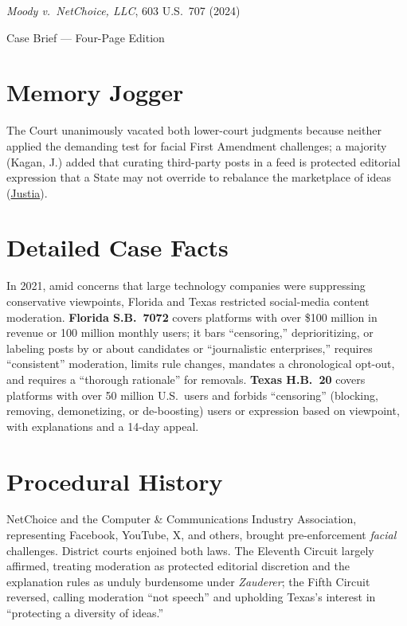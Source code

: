 \documentclass[12pt]{article}
\begin{document}
\begin{center}
{\LARGE \textit{Moody v.\ NetChoice, LLC}, 603 U.S.\ 707 (2024)\par}
\vspace{0.8em}
{\large Case Brief --- Four-Page Edition\par}
\end{center}
\vspace{1em}

\section{Memory Jogger}

The Court unanimously vacated both lower-court judgments because neither applied the demanding test for facial First Amendment challenges; a majority (Kagan, J.) added that curating third-party posts in a feed is protected editorial expression that a State may not override to rebalance the marketplace of ideas (\href{https://supreme.justia.com/cases/federal/us/603/22-277/}{Justia}).

\section{Detailed Case Facts}

In 2021, amid concerns that large technology companies were suppressing conservative viewpoints, Florida and Texas restricted social-media content moderation. \textbf{Florida S.B.~7072} covers platforms with over \$100 million in revenue or 100 million monthly users; it bars ``censoring,'' deprioritizing, or labeling posts by or about candidates or ``journalistic enterprises,'' requires ``consistent'' moderation, limits rule changes, mandates a chronological opt-out, and requires a ``thorough rationale'' for removals. \textbf{Texas H.B.~20} covers platforms with over 50 million U.S.\ users and forbids ``censoring'' (blocking, removing, demonetizing, or de-boosting) users or expression based on viewpoint, with explanations and a 14-day appeal.

\section{Procedural History}

NetChoice and the Computer \& Communications Industry Association, representing Facebook, YouTube, X, and others, brought pre-enforcement \emph{facial} challenges. District courts enjoined both laws. The Eleventh Circuit largely affirmed, treating moderation as protected editorial discretion and the explanation rules as unduly burdensome under \textit{Zauderer}; the Fifth Circuit reversed, calling moderation ``not speech'' and upholding Texas's interest in ``protecting a diversity of ideas.''
\end{document}
